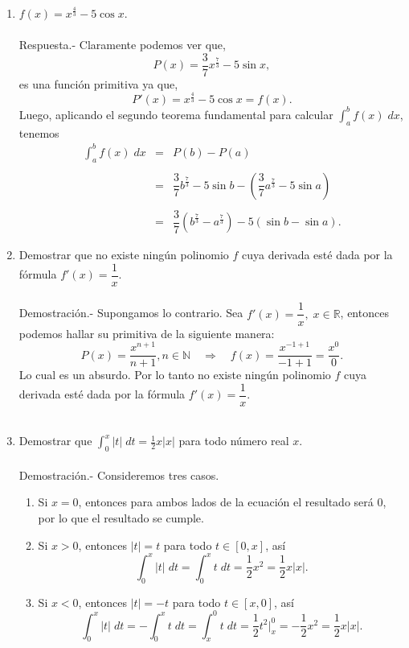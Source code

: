 \begin{enumerate}[\bfseries 1.]
    \item $f(x)=x^{\frac{4}{3}}-5\cos x$.\\\\
	Respuesta.-\; Claramente podemos ver que,
	$$P(x)=\dfrac{3}{7}x^{\frac{7}{3}}-5\sin x,$$
	es una función primitiva ya que,
	$$P'(x)=x^{\frac{4}{3}}-5\cos x = f(x).$$
	Luego, aplicando el segundo teorema fundamental para calcular $\int_a^b f(x)\; dx$, tenemos
	$$\begin{array}{rcl}
	    \displaystyle\int_a^b f(x)\; dx &=& P(b)-P(a)\\\\
					    &=& \dfrac{3}{7}b^{\frac{7}{3}}-5\sin b -\left(\dfrac{3}{7}a^{\frac{7}{3}}-5\sin a\right)\\\\
					    &=&\dfrac{3}{7}\left(b^{\frac{7}{3}}-a^{\frac{7}{3}}\right)-5\left(\sin b - \sin a\right).
	\end{array}$$
	\vspace{0.5cm}

    \item Demostrar que no existe ningún polinomio $f$ cuya derivada esté dada por la fórmula $f'(x)=\dfrac{1}{x}.$\\\\
	Demostración.-\; Supongamos lo contrario. Sea $f'(x)=\dfrac{1}{x},\; x\in \mathbb{R}$, entonces podemos hallar su primitiva de la siguiente manera:
	$$P(x)=\dfrac{x^{n+1}}{n+1}, n\in \mathbb{N}\quad \Rightarrow \quad f(x)=\dfrac{x^{-1+1}}{-1+1}=\dfrac{x^0}{0}.$$
	Lo cual es un absurdo. Por lo tanto no existe ningún polinomio $f$ cuya derivada esté dada por la fórmula $f'(x)=\dfrac{1}{x}.$\\\\

    \item Demostrar que $\int_0^x |t| \; dt = \frac{1}{2}x|x|$ para todo número real $x$.\\\\
	Demostración.-\; Consideremos tres casos.
	\begin{enumerate}
	    \item Si $x=0$, entonces para ambos lados de la ecuación el resultado será $0$, por lo que el resultado se cumple.
	    \item Si $x>0$, entonces $|t|=t$ para todo $t\in [0,x]$, así
		$$\int_0^x |t|\; dt = \int_0^x t \; dt = \dfrac{1}{2}x^2=\dfrac{1}{2}x|x|.$$
	    \item Si $x<0$, entonces $|t|=-t$ para todo $t\in [x,0]$, así
		$$\int_0^x |t|\; dt = -\int_0^x t \; dt=\int_x^0 t \; dt = \dfrac{1}{2}t^2\bigg|_x^0=-\dfrac{1}{2}x^2=\dfrac{1}{2}x|x|.$$
	\end{enumerate}
	\vspace{0.5cm}


\end{enumerate}
